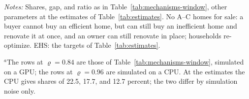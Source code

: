 \begin{table}[htbp]
  \centering
  \caption[The efficient share of owners without efficient homes for
  sale]{The efficient share of owners without efficient homes for
  sale}\label{tab:mechanisms-varrho}
  \begin{threeparttable}
    \small
    \begin{tablenotes}[flushleft]\footnotesize
      \item \textit{Notes:} Shares, gap, and ratio as in
      Table~\ref{tab:mechanisms-window}, other parameters at the estimates of
      Table~\ref{tab:estimates}. No A--C homes for sale: a buyer cannot buy
      an efficient home, but can still buy an inefficient home and renovate
      it at once, and an owner can still renovate in place; households
      re-optimize. EHS: the targets of Table~\ref{tab:estimates}.
      \item $^a$The rows at $\varrho=0.84$ are those of
      Table~\ref{tab:mechanisms-window}, simulated on a GPU; the rows at
      $\varrho=0.96$ are simulated on a CPU. At the estimates the CPU gives
      shares of 22.5, 17.7, and 12.7 percent; the two differ by simulation
      noise only.
    \end{tablenotes}
  \end{threeparttable}
\end{table}
